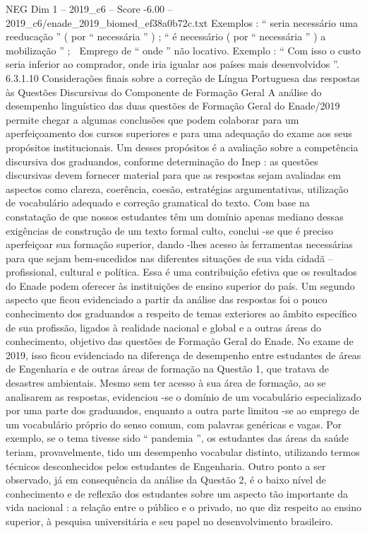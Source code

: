 \begin{textsample}{NEG Dim 1 – 2019\_c6 – Score -6.00 – 2019\_c6/enade\_2019\_biomed\_ef38a0b72c.txt}
Exemplos : “ seria necessário uma reeducação ” ( por “ necessária ” ) ; “ é necessário ( por “ necessária ” ) a mobilização ” ;  Emprego de “ onde ” não locativo.
Exemplo : “ Com isso o custo seria inferior ao comprador, onde iria igualar aos países mais desenvolvidos ”. 6.3.1.10 Considerações finais sobre a correção de Língua Portuguesa das respostas às Questões Discursivas do Componente de Formação Geral A análise do desempenho linguístico das duas questões de Formação Geral do Enade/2019 permite chegar a algumas conclusões que podem colaborar para um aperfeiçoamento dos cursos superiores e para uma adequação do exame aos seus propósitos institucionais.
Um desses propósitos é a avaliação sobre a competência discursiva dos graduandos, conforme determinação do Inep : as questões discursivas devem fornecer material para que as respostas sejam avaliadas em aspectos como clareza, coerência, coesão, estratégias argumentativas, utilização de vocabulário adequado e correção gramatical do texto.
Com base na constatação de que nossos estudantes têm um domínio apenas mediano dessas exigências de construção de um texto formal culto, conclui -se que é preciso aperfeiçoar sua formação superior, dando -lhes acesso às ferramentas necessárias para que sejam bem-sucedidos nas diferentes situações de sua vida cidadã – profissional, cultural e política.
Essa é uma contribuição efetiva que os resultados do Enade podem oferecer às instituições de ensino superior do país.
Um segundo aspecto que ficou evidenciado a partir da análise das respostas foi o pouco conhecimento dos graduandos a respeito de temas exteriores ao âmbito específico de sua profissão, ligados à realidade nacional e global e a outras áreas do conhecimento, objetivo das questões de Formação Geral do Enade.
No exame de 2019, isso ficou evidenciado na diferença de desempenho entre estudantes de áreas de Engenharia e de outras áreas de formação na Questão 1, que tratava de desastres ambientais.
Mesmo sem ter acesso à sua área de formação, ao se analisarem as respostas, evidenciou -se o domínio de um vocabulário especializado por uma parte dos graduandos, enquanto a outra parte limitou -se ao emprego de um vocabulário próprio do senso comum, com palavras genéricas e vagas.
Por exemplo, se o tema tivesse sido “ pandemia ”, os estudantes das áreas da saúde teriam, provavelmente, tido um desempenho vocabular distinto, utilizando termos técnicos desconhecidos pelos estudantes de Engenharia.
Outro ponto a ser observado, já em consequência da análise da Questão 2, é o baixo nível de conhecimento e de reflexão dos estudantes sobre um aspecto tão importante da vida nacional : a relação entre o público e o privado, no que diz respeito ao ensino superior, à pesquisa universitária e seu papel no desenvolvimento brasileiro.

\end{textsample}
